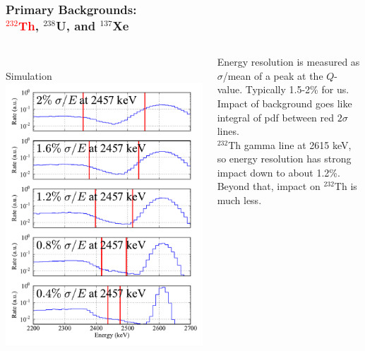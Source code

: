 \documentclass{beamer}
\begin{document}
\begin{frame}
\begin{center}
\frametitle{\hfill Primary Backgrounds:\\\hfill \textcolor{red}{$^{232}$Th}, $^{238}$U, and $^{137}$Xe}
\end{center}
\begin{columns}
\begin{column}{.59\textwidth}
\vspace{-0.5cm}\\%
Simulation\\
\includegraphics[keepaspectratio=true,width=\textwidth]{Th_Spectra_vs_Res.pdf}
\end{column}
\begin{column}{.41\textwidth}
\vspace{0.5cm}%

Energy resolution is measured as $\sigma$/mean of a peak at the $Q$-value.  Typically 1.5-2\% for us.\\[\baselineskip]

Impact of background goes like integral of pdf between red $2\sigma$ lines.\\[\baselineskip]

$^{232}$Th gamma line at 2615 keV, so energy resolution has strong impact down to about 1.2\%.\\[\baselineskip]

Beyond that, impact on $^{232}$Th is much less.
\end{column}
\end{columns}
\end{frame}
\end{document}
